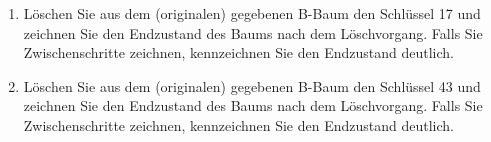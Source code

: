 \documentclass{lehramt-informatik-aufgabe}
\begin{document}
\begin{enumerate}
\begin{enumerate}

\item Löschen Sie aus dem (originalen) gegebenen B-Baum den Schlüssel 17
und zeichnen Sie den Endzustand des Baums nach dem Löschvorgang. Falls
Sie Zwischenschritte zeichnen, kennzeichnen Sie den Endzustand deutlich.

\begin{liAntwort}
\begin{center}
\end{center}
\end{liAntwort}


\item Löschen Sie aus dem (originalen) gegebenen B-Baum den Schlüssel 43
und zeichnen Sie den Endzustand des Baums nach dem Löschvorgang. Falls
Sie Zwischenschritte zeichnen, kennzeichnen Sie den Endzustand deutlich.

\begin{liAntwort}
\end{liAntwort}

\end{enumerate}

\end{enumerate}
\end{document}
